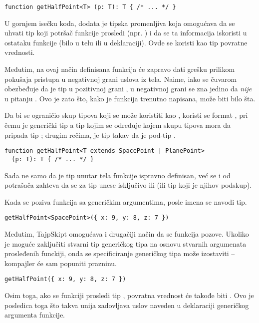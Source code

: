 \begin{verbatim}
function getHalfPoint<T> (p: T): T { /* ... */ }
\end{verbatim}

U gornjem isečku koda, dodata je tipska promenljiva  koja omogućava da se uhvati tip koji potršač funkcije prosledi (npr. ) i da se ta informacija iskoristi u ostataku funkcije (bilo u telu ili u deklaraciji).
Ovde se  koristi kao tip povratne vrednosti.

Međutim, na ovaj način definisana funkcija će zapravo dati grešku prilikom pokušaja pristupa u negativnoj grani uslova iz tela.
Naime, iako se čuvarom obezbeđuje da je tip u pozitivnoj grani , u negativnoj grani se zna jedino da \emph{nije} u pitanju .
Ovo je zato što, kako je funkcija trenutno napisana,  može biti bilo šta.

Da bi se ograničio skup tipova koji se može koristiti kao , koristi se format , pri čemu je  generički tip a  tip kojim se određuje kojem skupu tipova mora da pripada tip ; drugim rečima,  je tip takav da je  pod-tip .

\begin{verbatim}
function getHalfPoint<T extends SpacePoint | PlanePoint>
  (p: T): T { /* ... */ }
\end{verbatim}

Sada ne samo da je tip unutar tela funkcije ispravno definisan, već se i od potrašača zahteva da se za tip unese isključivo  ili  (ili tip koji je njihov podskup).

Kada se poziva funkcija sa generičkim argumentima, posle imena se navodi tip.

\begin{verbatim}
getHalfPoint<SpacePoint>({ x: 9, y: 8, z: 7 })
\end{verbatim}

Međutim, TajpSkipt omogućava i drugačiji način da se funkcija pozove.
Ukoliko je moguće zaključiti stvarni tip generičkog tipa na osnovu stvarnih argumenata prosleđenih funckiji, onda se specificiranje generičkog tipa može izostaviti -- kompajler će sam popuniti prazninu.

\begin{verbatim}
getHalfPoint({ x: 9, y: 8, z: 7 })
\end{verbatim}

Osim toga, ako se funkciji prosledi tip , povratna vrednost će takođe biti .
Ovo je posledica toga što takva unija zadovljava  uslov naveden u deklaraciji generičkog argumenta funkcije.

